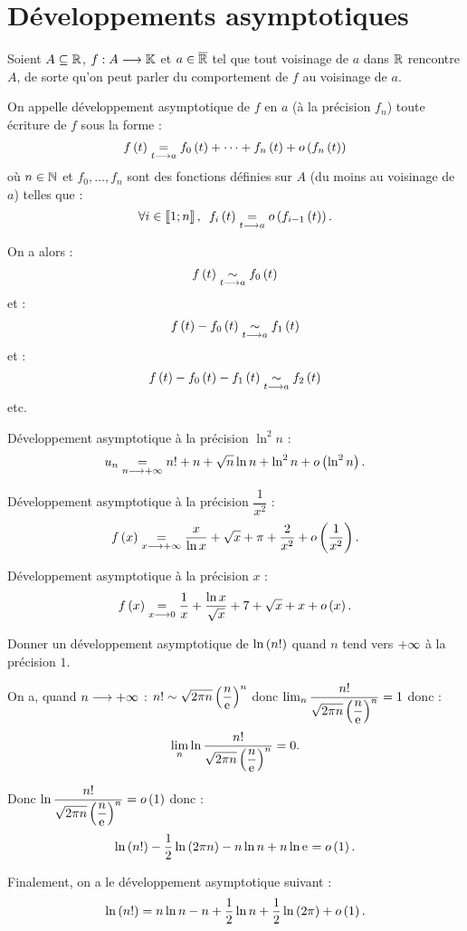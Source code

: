 \section{Développements asymptotiques}

\begin{defi}
Soient \(A\subseteq\mathbb{R}\), \(f:A\longrightarrow\mathbb{K}\) et \(a\in\overline{\mathbb{R}}\) tel que tout voisinage de \(a\) dans \(\mathbb{R}\) rencontre \(A\), de sorte qu'on peut parler du comportement de \(f\) au voisinage de \(a\).

On appelle développement asymptotique de \(f\) en \(a\) (à la précision \(f_n\)) toute écriture de \(f\) sous la forme : \[f\left(t\right)\underset{t\longrightarrow a}{=}f_0\left(t\right)+\dots+f_n\left(t\right)+o\left(f_n\left(t\right)\right)\] où \(n\in\mathbb{N}\) et \(f_0,\dots,f_n\) sont des fonctions définies sur \(A\) (du moins au voisinage de \(a\)) telles que : \[\quantifs{\forall i\in\interventierii{1}{n}}f_i\paren{t}\egqd{t\to a}\o{f_{i-1}\paren{t}}.\]

On a alors : \[f\left(t\right)\underset{t\longrightarrow a}{\sim}f_0\left(t\right)\] et : \[f\left(t\right)-f_0\left(t\right)\underset{t\longrightarrow a}{\sim}f_1\left(t\right)\] et : \[f\left(t\right)-f_0\left(t\right)-f_1\left(t\right)\underset{t\longrightarrow a}{\sim}f_2\left(t\right)\] etc.
\end{defi}

\begin{ex}
Développement asymptotique à la précision \(\ln^2n\) : \[u_n\underset{n\longrightarrow+\infty}{=}n!+n+\sqrt{n}\ln n+\ln^2n+o\left(\ln^2n\right).\]

Développement asymptotique à la précision \(\dfrac{1}{x^2}\) : \[f\left(x\right)\underset{x\longrightarrow+\infty}{=}\dfrac{x}{\ln x}+\sqrt{x}+\pi+\dfrac{2}{x^2}+o\left(\dfrac{1}{x^2}\right).\]

Développement asymptotique à la précision \(x\) : \[f\left(x\right)\underset{x\longrightarrow0}{=}\dfrac{1}{x}+\dfrac{\ln x}{\sqrt{x}}+7+\sqrt{x}+x+o\left(x\right).\]
\end{ex}

\begin{exoex}
Donner un développement asymptotique de \(\ln\left(n!\right)\) quand \(n\) tend vers \(+\infty\) à la précision \(1\).
\end{exoex}

\begin{corr}
On a, quand \(n\longrightarrow+\infty\) : \(n!\sim\sqrt{2\pi n}\left(\dfrac{n}{\mathrm{e}^{}}\right)^n\) donc \(\lim_n\dfrac{n!}{\sqrt{2\pi n}\left(\dfrac{n}{\mathrm{e}^{}}\right)^n}=1\) donc : \[\lim_n\ln\dfrac{n!}{\sqrt{2\pi n}\left(\dfrac{n}{\mathrm{e}^{}}\right)^n}=0.\]

Donc \(\ln\dfrac{n!}{\sqrt{2\pi n}\left(\dfrac{n}{\mathrm{e}^{}}\right)^n}=o\left(1\right)\) donc : \[\ln\left(n!\right)-\dfrac{1}{2}\ln\left(2\pi n\right)-n\ln n+n\ln\mathrm{e}^{}=o\left(1\right).\]

Finalement, on a le développement asymptotique suivant : \[\ln\left(n!\right)=n\ln n-n+\dfrac{1}{2}\ln n+\dfrac{1}{2}\ln\left(2\pi\right)+o\left(1\right).\]
\end{corr}

